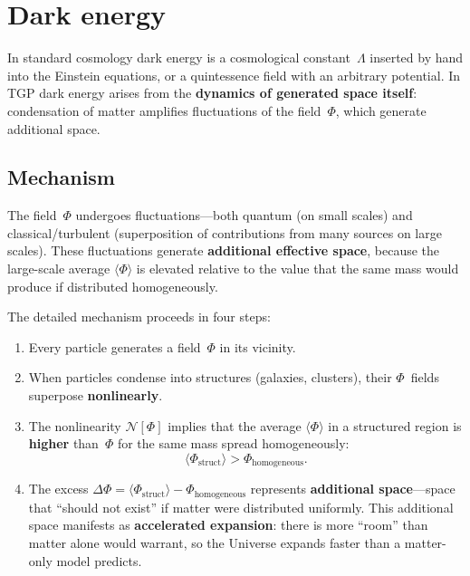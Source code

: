 \section{Dark energy}\label{sec:ciemna}

In standard cosmology dark energy is a cosmological constant~$\Lambda$
inserted by hand into the Einstein equations, or a quintessence field
with an arbitrary potential.  In TGP dark energy arises from the
\textbf{dynamics of generated space itself}: condensation of matter
amplifies fluctuations of the field~$\Phi$, which generate additional
space.

\subsection{Mechanism}\label{ssec:de-mech}

\begin{proposition}%
\label{prop:DE}
The field~$\Phi$ undergoes fluctuations---both quantum (on small
scales) and classical/turbulent (superposition of contributions from
many sources on large scales).  These fluctuations generate
\textbf{additional effective space}, because the large-scale average
$\langle\Phi\rangle$ is elevated relative to the value that the same
mass would produce if distributed homogeneously.
\end{proposition}

The detailed mechanism proceeds in four steps:
\begin{enumerate}[nosep]
  \item Every particle generates a field~$\Phi$ in its vicinity.
  \item When particles condense into structures (galaxies, clusters),
        their $\Phi$~fields superpose \textbf{nonlinearly}.
  \item The nonlinearity $\mathcal{N}[\Phi]$ implies that the
        average $\langle\Phi\rangle$ in a structured region is
        \textbf{higher} than~$\Phi$ for the same mass spread
        homogeneously:
        \begin{equation}\label{eq:Phi-excess}
            \langle\Phi_{\mathrm{struct}}\rangle
            > \Phi_{\mathrm{homogeneous}}.
        \end{equation}
  \item The excess
        $\Delta\Phi = \langle\Phi_{\mathrm{struct}}\rangle
        - \Phi_{\mathrm{homogeneous}}$
        represents \textbf{additional space}---space that ``should
        not exist'' if matter were distributed uniformly.
        This additional space manifests as \textbf{accelerated
        expansion}: there is more ``room'' than matter alone
        would warrant, so the Universe expands faster than a
        matter-only model predicts.
\end{enumerate}

